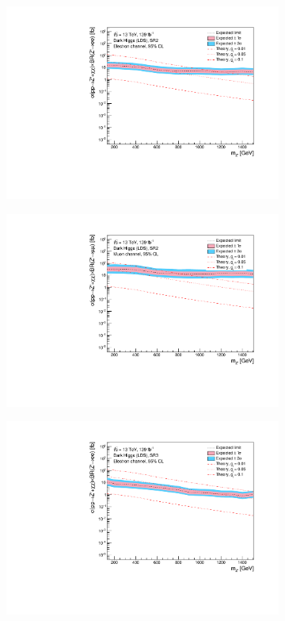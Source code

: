 \documentclass[12pt, a4paper]{book}
\begin{document}
\begin{figure}[!ht]
\begin{subfigure}[b]{0.49\textwidth}
      \includegraphics[width=1\textwidth]{Limits/Model_independent/100-150/DH_LDS/mass_exclusion_ee.pdf}
   \end{subfigure}
   \hfill
   \begin{subfigure}[b]{0.49\textwidth}
      \centering
      \includegraphics[width=1\textwidth]{Limits/Model_independent/100-150/DH_LDS/mass_exclusion_uu.pdf}
   \end{subfigure}
   \hfill
	\begin{subfigure}[b]{0.49\textwidth}
      \centering
      \includegraphics[width=1\textwidth]{Limits/Model_independent/150/DH_LDS/mass_exclusion_ee.pdf}

\end{subfigure}
\end{figure}
\end{document}
